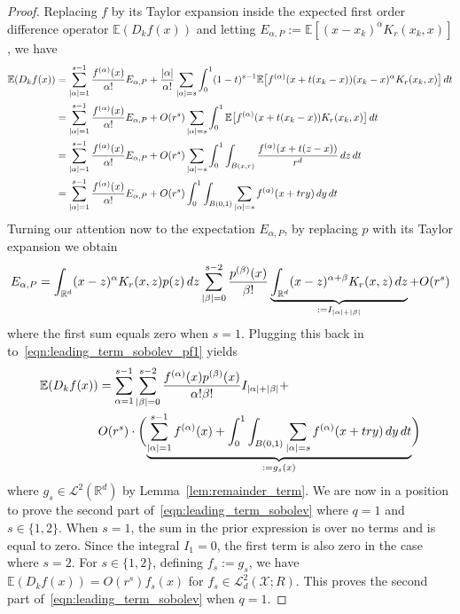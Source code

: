\documentclass{article}
\newcommand{\Reals}{\mathbb{R}}
\newcommand{\1}{\mathbf{1}}
\newcommand{\Rd}{\Reals^d}
\newcommand{\Xset}{\mathcal{X}}
\newcommand{\Leb}{\mathcal{L}}
\newcommand{\Ebb}{\mathbb{E}}
\theoremstyle{alden}
\theoremstyle{aldenthm}
\theoremstyle{definition}
\theoremstyle{remark}
\begin{document}
\begin{proof}
	Replacing $f$ by its Taylor expansion inside the expected first order difference operator $\Ebb(D_kf(x))$ and letting $E_{\alpha,P} := \Ebb\left[(x - x_k)^{\alpha}K_r(x_k,x)\right]$, we have
	\begin{align}
	\Ebb(D_kf(x)) & = \sum_{\abs{\alpha} = 1}^{s - 1} \frac{f^{(\alpha)}(x)}{\alpha!} E_{\alpha,P} + \frac{\abs{\alpha}}{\alpha!}\sum_{\abs{\alpha} = s} \int_{0}^{1}(1 - t)^{s - 1} \Ebb\bigl[f^{(\alpha)}(x + t(x_k - x)) (x_k - x)^{\alpha} K_r(x_k,x)\bigr] \,dt \nonumber \\
	& =  \sum_{\abs{\alpha} = 1}^{s - 1} \frac{f^{(\alpha)}(x)}{\alpha!} E_{\alpha,P} + O(r^s)\sum_{\abs{\alpha} = s} \int_{0}^{1}\Ebb\bigl[f^{(\alpha)}(x + t(x_k - x))K_r(x_k,x)\bigr] \,dt \nonumber \\
	& =  \sum_{\abs{\alpha} = 1}^{s - 1} \frac{f^{(\alpha)}(x)}{\alpha!} E_{\alpha,P} + O(r^s)\sum_{\abs{\alpha} = s} \int_{0}^{1} \int_{B(x,r)}\frac{f^{(\alpha)}(x + t(z - x))}{r^d} \,dz \,dt \nonumber \\
	& = \sum_{\abs{\alpha} = 1}^{s - 1} \frac{f^{(\alpha)}(x)}{\alpha!} E_{\alpha,P} + O(r^s)\int_{0}^{1} \int_{B(0,1)} \sum_{\abs{\alpha} = s} f^{(\alpha)}(x + try) \,dy \,dt \label{eqn:leading_term_sobolev_pf1}
	\end{align}
	Turning our attention now to the expectation $E_{\alpha,P}$, by replacing $p$ with its Taylor expansion we obtain
	\begin{equation*}
	E_{\alpha,P} = \int_{\Rd} (x - z)^{\alpha} K_r(x,z) p(z) \,dz \sum_{\abs{\beta} = 0}^{s - 2} \frac{p^{(\beta)}(x)}{\beta!} \underbrace{\int_{\Rd} (x - z)^{\alpha + \beta}K_r(x,z)\,dz}_{:=I_{\abs{\alpha} + \abs{\beta}}} + O(r^{s})
	\end{equation*}
	where the first sum equals zero when $s = 1$. Plugging this back in to~\eqref{eqn:leading_term_sobolev_pf1} yields
	\begin{align*}
	\Ebb(D_kf(x)) & = \sum_{\alpha = 1}^{s - 1} \sum_{\abs{\beta} = 0}^{s-2} \frac{f^{(\alpha)}(x)p^{(\beta)}(x)}{\alpha!\beta!} I_{\abs{\alpha} + \abs{\beta}} + \\ & O(r^s)\cdot\biggl(\underbrace{\sum_{\abs{\alpha} = 1}^{s-1}  f^{(\alpha)}(x) + \int_{0}^{1} \int_{B(0,1)} \sum_{\abs{\alpha} = s} f^{(\alpha)}(x + try) \,dy \,dt}_{: = g_s(x)}\biggr)
	\end{align*}
	where $g_s \in \Leb^2(\Rd)$ by Lemma~\ref{lem:remainder_term}. We are now in a position to prove the second part of~\eqref{eqn:leading_term_sobolev} where $q = 1$ and $s \in \{1,2\}$. When $s = 1$, the sum in the prior expression is over no terms and is equal to zero. Since the integral $I_{1} = 0$, the first term is also zero in the case where $s = 2$. For $s \in \{1,2\}$, defining $f_s := g_s$, we have $\Ebb(D_kf(x)) = O(r^s) f_s(x)$ for $f_s \in \Leb_d^2(\Xset;R)$. This proves the second part of~\eqref{eqn:leading_term_sobolev} when $q = 1$.
	

\end{proof}
\end{document}
